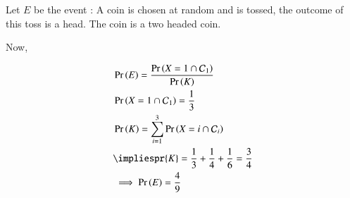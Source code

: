 \documentclass[journal,12pt,twocolumn]{IEEEtran}
\begin{document}
\noindent Let $E$ be the event : A coin is chosen at random and is tossed, the outcome of this toss is a head. The coin is a two headed coin.

\noindent Now,

\begin{align}
   & \pr{E} = \frac{\pr{X = 1 \cap \mathcal{C}_1}}{\pr{K}} \\
    &\pr{X = 1 \cap \mathcal{C}_1} = \frac{1}{3} \\
    &\pr{K} = \sum_{i = 1}^{3}{\pr{X = i \cap \mathcal{C}_i}} \\
    &\impliespr{K} = \frac{1}{3} + \frac{1}{4} + \frac{1}{6} = \frac{3}{4} \\
    &\implies \pr{E} = \frac{4}{9}
\end{align}
\end{document}
